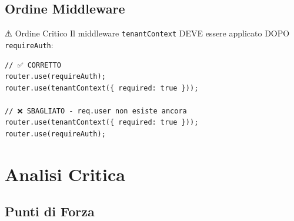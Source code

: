 \documentclass[11pt,a4paper]{article}
\begin{document}
\subsection{Ordine Middleware}

\begin{warningbox}{⚠️ Ordine Critico}
Il middleware \texttt{tenantContext} DEVE essere applicato DOPO \texttt{requireAuth}:

\begin{lstlisting}
// ✅ CORRETTO
router.use(requireAuth);
router.use(tenantContext({ required: true }));

// ❌ SBAGLIATO - req.user non esiste ancora
router.use(tenantContext({ required: true }));
router.use(requireAuth);
\end{lstlisting}
\end{warningbox}

\section{Analisi Critica}

\subsection{Punti di Forza}
\end{document}
